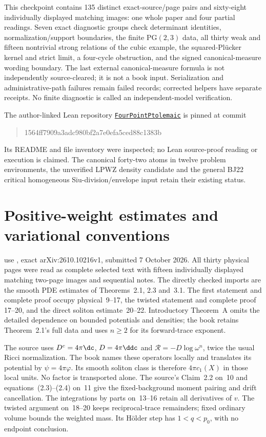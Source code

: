 This checkpoint contains 135 distinct exact-source/page
pairs and sixty-eight individually displayed matching
images: one whole paper and four partial readings.
Seven exact diagnostic groups check determinant identities,
normalization/support boundaries, the finite PG$(2,3)$
data, all thirty weak and fifteen nontrivial strong
relations of the cubic example, the squared-Pl\"ucker
kernel and strict limit, a four-cycle obstruction, and
the signed canonical-measure wording boundary. The last
external canonical-measure formula is not independently
source-cleared; it is not a book input. Serialization
and administrative-path failures remain failed records;
corrected helpers have separate receipts. No finite
diagnostic is called an independent-model verification.

The author-linked Lean repository
\href{https://github.com/icarm/FourPointPtolemaic}{\texttt{FourPointPtolemaic}}
is pinned at commit
\begin{quote}
\small\ttfamily 1564ff7909a3adc980bf2a7e0efa5ced88c1383b
\end{quote}
Its README and file inventory were inspected; no Lean
source-proof reading or execution is claimed. The
canonical forty-two atoms in twelve problem environments,
the unverified LPWZ density candidate and the general
BJ22 critical homogeneous Siu-division/envelope input
retain their existing status.

\section{Positive-weight estimates and variational conventions}
\label{sec:appL-positive-weight-sources}

use \cite{JubertPan26PositiveWeightsV1}, exact
arXiv:2610.10216v1, submitted 7 October 2026. All thirty physical
pages were read as complete selected text with fifteen individually
displayed matching two-page images and sequential notes.
The directly checked imports are the smooth PDE estimates of
Theorems~2.1, 2.3 and~3.1. The first statement and complete proof
occupy physical~9--17, the twisted statement and complete proof
17--20, and the direct soliton estimate~20--22. Introductory
Theorem~A omits the detailed dependence on bounded potentials and
densities; the book retains Theorem~2.1's full data and uses $n\geq2$
for its forward-trace exponent.

The source uses $D^c=4\pi\dc$, $D=4\pi\ddc$ and
$\mathcal R=-D\log\omega^n$, twice the usual Ricci normalization.
The book names these operators locally and translates its potential
by $\psi=4\pi\varphi$. Its smooth soliton class is therefore
$4\pi c_1(X)$ in those local units. No factor is transported alone.
The source's Claim~2.2 on~10 and equations~(2.3)--(2.4) on~11
give the fixed-background moment pairing and drift cancellation.
The integrations by parts on~13--16 retain all derivatives of $v$.
The twisted argument on~18--20 keeps reciprocal-trace remainders;
fixed ordinary volume bounds the weighted mass. Its H\"older step
has $1<q<p_0$, with no endpoint conclusion.

